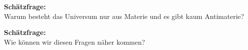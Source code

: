 \begin{frame} \Large
    \begin{center}
     \textcolor{LHCbDarkBlue}{\textbf{Schätzfrage:} }\\  \vspace{1cm}
     Warum besteht das Universum nur aus Materie und es gibt kaum Antimaterie?
    \end{center}
    \begin{center}  \vspace{1cm}\pause
    \end{center}
\end{frame}








\begin{frame} \Large
    \begin{center}
     \textcolor{LHCbDarkBlue}{\textbf{Schätzfrage:} }\\  \vspace{1cm}
     Wie können wir diesen Fragen näher kommen?
    \end{center}\pause 
    \begin{center}  \vspace{1cm}
    \end{center}
\end{frame}

